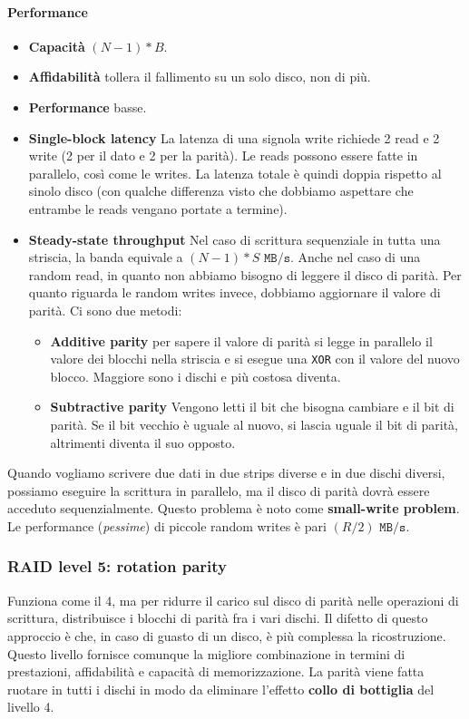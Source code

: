 \documentclass[12pt, twoside, letterpaper]{article}
\begin{document}
				\paragraph{Performance}
					\begin{itemize}
						\item \textbf{Capacità} $(N-1)*B$.
						\item \textbf{Affidabilità} tollera il fallimento su un solo disco, non di più.
						\item \textbf{Performance} basse.
						\item \textbf{Single-block latency} La latenza di una signola write richiede 2 read e 2 write (2 per il dato e 2 per la parità). Le reads possono essere fatte in parallelo, così come le writes. La latenza totale è quindi doppia rispetto al sinolo disco (con qualche differenza visto che dobbiamo aspettare che entrambe le reads vengano portate a termine).
						\item \textbf{Steady-state throughput} Nel caso di scrittura sequenziale in tutta una striscia, la banda equivale a $(N-1)*S \texttt{ MB/s}$. Anche nel caso di una random read, in quanto non abbiamo bisogno di leggere il disco di parità. Per quanto riguarda le random writes invece, dobbiamo aggiornare il valore di parità. Ci sono due metodi: 
							\begin{itemize}
								\item \textbf{Additive parity} per sapere il valore di parità si legge in parallelo il valore dei blocchi nella striscia e si esegue una \texttt{XOR} con il valore del nuovo blocco. Maggiore sono i dischi e più costosa diventa.
								\item \textbf{Subtractive parity} Vengono letti il bit che bisogna cambiare e il bit di parità. Se il bit vecchio è uguale al nuovo, si lascia uguale il bit di parità, altrimenti diventa il suo opposto.
							\end{itemize}
					\end{itemize}
					Quando vogliamo scrivere due dati in due strips diverse e in due dischi diversi, possiamo eseguire la scrittura in parallelo, ma il disco di parità dovrà essere acceduto sequenzialmente. Questo problema è noto come \textbf{small-write problem}. Le performance (\textit{pessime}) di piccole random writes è pari  $(R/2) \texttt{ MB/s}$. 
				
			\subsubsection{RAID level 5: rotation parity}
				Funziona come il 4, ma per ridurre il carico sul disco di parità nelle operazioni di scrittura, distribuisce i blocchi di parità fra i vari dischi. Il difetto di questo approccio è che, in caso di guasto di un disco, è più complessa la ricostruzione. Questo livello fornisce comunque la migliore combinazione in termini di prestazioni, affidabilità e capacità di memorizzazione. La parità viene fatta ruotare in tutti i dischi in modo da eliminare l'effetto \textbf{collo di bottiglia} del livello 4.
				
\end{document}
